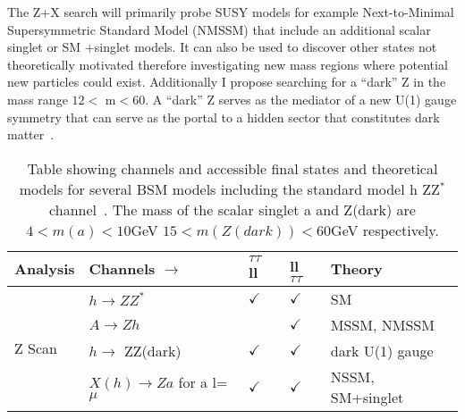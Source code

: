 The Z+X search will primarily probe SUSY models for example Next-to-Minimal Supersymmetric Standard Model (NMSSM) that include an additional scalar singlet or SM +singlet models.  It can also be used to discover other states not theoretically motivated therefore investigating new mass regions where potential new particles could exist.
Additionally I propose searching for a ``dark'' Z in the mass range $12<$ m$<60$. A ``dark'' Z serves as the mediator of a new U(1) gauge symmetry that can serve as the portal to a hidden sector that constitutes dark matter~\cite{zdark}. 


\begin{table}[h]
\begin{center}
\begin{tabular}{ l |  l    |  l                   | l         || l    }  \hline 
 Analysis   & Channels        $\rightarrow$  &  $\tau \tau$ ll  & ll $\tau \tau$  &   Theory  \\ \hline \hline
\multirow{4}{*}{Z Scan} & $h\rightarrow ZZ^*$ &  $\checkmark$ & $\checkmark$                     & SM \\  

  &$A \rightarrow Zh$            &                    & $\checkmark$     &   MSSM, NMSSM \\  
  &$h \rightarrow$ ZZ(dark)  &    $ \checkmark$          & $\checkmark$  &dark U(1) gauge     \\   
  &$X(h) \rightarrow  Za$ for a l=$\mu$  &  $\checkmark$      & $\checkmark$ &   NSSM, SM+singlet\\ \hline \hline

    \hline
    \end{tabular}
    \caption{ Table showing channels and accessible final states and theoretical models for several BSM models including the standard model h \too ZZ$^*$ channel~\cite{hexotic}.  The mass of the scalar singlet a and Z(dark) are  $4  <m(a)< 10 $GeV   $15 < m(Z(dark)) < 60 $GeV respectively.}
\label{tab:anal}
\end{center}
\end{table}


